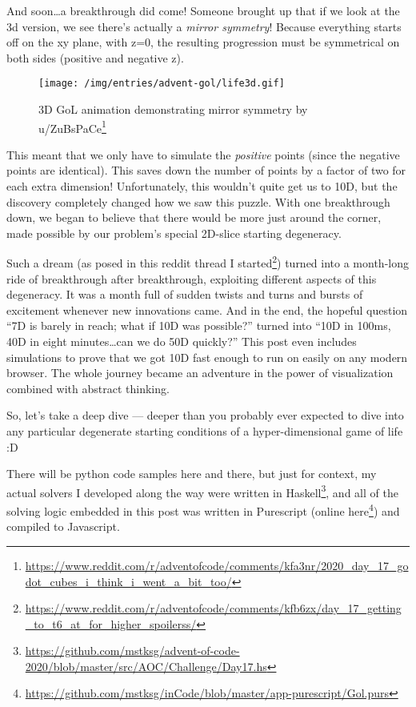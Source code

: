 \documentclass[]{article}
\renewcommand{\href}[2]{#2\footnote{\url{#1}}}
\begin{document}
And soon\ldots a breakthrough did come! Someone brought up that if we look at
the 3d version, we see there's actually a \emph{mirror symmetry}! Because
everything starts off on the xy plane, with z=0, the resulting progression must
be symmetrical on both sides (positive and negative z).

\begin{figure}
\centering
\texttt{[image: /img/entries/advent-gol/life3d.gif]}
\caption{3D GoL animation demonstrating mirror symmetry by
\href{https://www.reddit.com/r/adventofcode/comments/kfa3nr/2020_day_17_godot_cubes_i_think_i_went_a_bit_too/}{u/ZuBsPaCe}}
\end{figure}

This meant that we only have to simulate the \emph{positive} points (since the
negative points are identical). This saves down the number of points by a factor
of two for each extra dimension! Unfortunately, this wouldn't quite get us to
10D, but the discovery completely changed how we saw this puzzle. With one
breakthrough down, we began to believe that there would be more just around the
corner, made possible by our problem's special 2D-slice starting degeneracy.

Such a dream (as posed in
\href{https://www.reddit.com/r/adventofcode/comments/kfb6zx/day_17_getting_to_t6_at_for_higher_spoilerss/}{this
reddit thread I started}) turned into a month-long ride of breakthrough after
breakthrough, exploiting different aspects of this degeneracy. It was a month
full of sudden twists and turns and bursts of excitement whenever new
innovations came. And in the end, the hopeful question ``7D is barely in reach;
what if 10D was possible?'' turned into ``10D in 100ms, 40D in eight
minutes\ldots can we do 50D quickly?'' This post even includes simulations to
prove that we got 10D fast enough to run on easily on any modern browser. The
whole journey became an adventure in the power of visualization combined with
abstract thinking.

So, let's take a deep dive --- deeper than you probably ever expected to dive
into any particular degenerate starting conditions of a hyper-dimensional game
of life :D

There will be python code samples here and there, but just for context, my
actual solvers I developed along the way were
\href{https://github.com/mstksg/advent-of-code-2020/blob/master/src/AOC/Challenge/Day17.hs}{written
in Haskell}, and all of the solving logic embedded in this post was written in
Purescript
(\href{https://github.com/mstksg/inCode/blob/master/app-purescript/Gol.purs}{online
here}) and compiled to Javascript.
\end{document}
